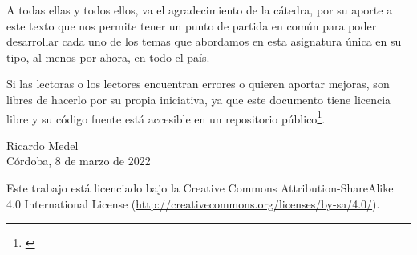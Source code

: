 A todas ellas y todos ellos, va el agradecimiento de la cátedra, por su aporte a este texto que nos permite tener un punto de partida en común para poder desarrollar cada uno de los temas que abordamos en esta asignatura única en su tipo, al menos por ahora, en todo el país.
 
Si las lectoras o los lectores encuentran errores o quieren aportar mejoras, son libres de hacerlo por su propia iniciativa, ya que este documento tiene licencia libre y su código fuente está accesible en un repositorio público\footnote{\url{}}.

\parbox{2in}{\vspace{2in}}
\hfill
\parbox{2in}%
{Ricardo Medel\\%
Córdoba, 8 de marzo de 2022\\%
\mbox{}} 

Este trabajo está licenciado bajo la Creative Commons Attribution-ShareAlike 4.0 International License (\url{http://creativecommons.org/licenses/by-sa/4.0/}).

